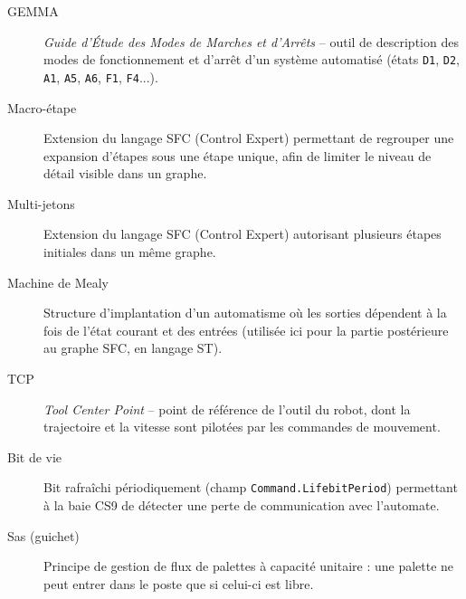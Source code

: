 \begin{description}
    \item[GEMMA] \emph{Guide d'Étude des Modes de Marches et d'Arrêts} -- outil de description des modes de fonctionnement et d'arrêt d'un système automatisé (états \texttt{D1}, \texttt{D2}, \texttt{A1}, \texttt{A5}, \texttt{A6}, \texttt{F1}, \texttt{F4}...).
    \item[Macro-étape] Extension du langage SFC (Control Expert) permettant de regrouper une expansion d'étapes sous une étape unique, afin de limiter le niveau de détail visible dans un graphe.
    \item[Multi-jetons] Extension du langage SFC (Control Expert) autorisant plusieurs étapes initiales dans un même graphe.
    \item[Machine de Mealy] Structure d'implantation d'un automatisme où les sorties dépendent à la fois de l'état courant et des entrées (utilisée ici pour la partie postérieure au graphe SFC, en langage ST).
    \item[TCP] \emph{Tool Center Point} -- point de référence de l'outil du robot, dont la trajectoire et la vitesse sont pilotées par les commandes de mouvement.
    \item[Bit de vie] Bit rafraîchi périodiquement (champ \texttt{Command.LifebitPeriod}) permettant à la baie CS9 de détecter une perte de communication avec l'automate.
    \item[Sas (guichet)] Principe de gestion de flux de palettes à capacité unitaire : une palette ne peut entrer dans le poste que si celui-ci est libre.
\end{description}
